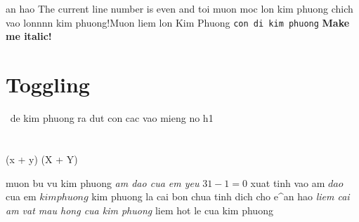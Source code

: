 \begin{num vu kim phuong}
an hao The current line number is even and toi muon moc lon kim phuong
chich vao lonnnn kim phuong!\beta Muon liem lon Kim Phuong
\texttt{con di kim phuong}
\texttt{}
\textbf{Make me italic!}
\section*{Toggling}
$\frac{}{}$
de kim phuong ra dut con cac vao mieng no h1
\section{}
\begin{}
(x + y)
\left(X + Y\right)
\end{}
muon bu vu kim phuong
	\textit{am dao cua em yeu}
$ 31 - 1 = 0 $ 
xuat tinh vao am $dao$ cua em $kim phuong$
kim phuong la cai bon chua tinh dich cho e^{an hao}
	\textit{liem cai am vat mau hong cua kim phuong}
{liem hot le cua kim phuong}
\end{num vu kim phuong}
